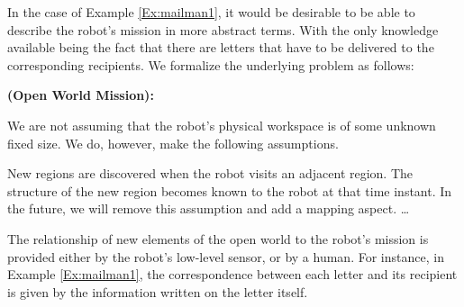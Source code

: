 In the case of Example \ref{Ex:mailman1}, it would be desirable to be able to describe the robot's mission in more abstract terms. With the only knowledge available being the fact that there are letters that have to be delivered to the corresponding recipients. We formalize the underlying problem as follows:

\begin{myProblem}
	\textbf{(Open World Mission):} %
\end{myProblem}

We are not assuming that the robot's physical workspace is of some unknown fixed size. We do, however, make the following assumptions.

\begin{myAssumption}
	New regions are discovered when the robot visits an adjacent region. The structure of the new region becomes known to the robot at that time instant. In the future, we will remove this assumption and add a mapping aspect. \ldots
\end{myAssumption}

\begin{myAssumption}
	The relationship of new elements of the open world to the robot's mission is provided either by the robot's low-level sensor, or by a human. For instance, in Example \ref{Ex:mailman1}, the correspondence between each letter and its recipient is given by the information written on the letter itself.
\end{myAssumption}

